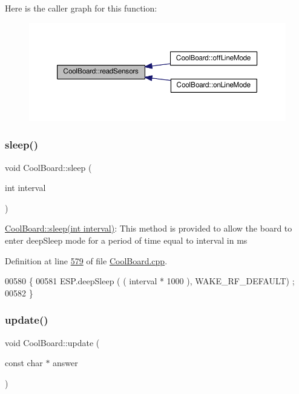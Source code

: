 Here is the caller graph for this function\+:
\nopagebreak
\begin{figure}[H]
\begin{center}
\leavevmode
\includegraphics[width=350pt]{class_cool_board_ad03abdce2e65f520bbf2cff0f2d083cf_icgraph}
\end{center}
\end{figure}
\mbox{\label{class_cool_board_a5d0c8ff93b615efd676be432de9f164a}} 
\subsubsection{\texorpdfstring{sleep()}{sleep()}}
{\footnotesize\ttfamily void Cool\+Board\+::sleep (\begin{DoxyParamCaption}\item[{int}]{interval }\end{DoxyParamCaption})}

\hyperlink{class_cool_board_a5d0c8ff93b615efd676be432de9f164a}{Cool\+Board\+::sleep(int interval)}\+: This method is provided to allow the board to enter deep\+Sleep mode for a period of time equal to interval in ms 

Definition at line \hyperlink{_cool_board_8cpp_source_l00579}{579} of file \hyperlink{_cool_board_8cpp_source}{Cool\+Board.\+cpp}.


\begin{DoxyCode}
00580 \{
00581     ESP.deepSleep ( ( interval * 1000 ), WAKE\_RF\_DEFAULT) ;
00582 \}
\end{DoxyCode}
\mbox{\label{class_cool_board_a8612756d3f73198cdde857a66f0fe690}} 
\subsubsection{\texorpdfstring{update()}{update()}}
{\footnotesize\ttfamily void Cool\+Board\+::update (\begin{DoxyParamCaption}\item[{const char $\ast$}]{answer }\end{DoxyParamCaption})}

